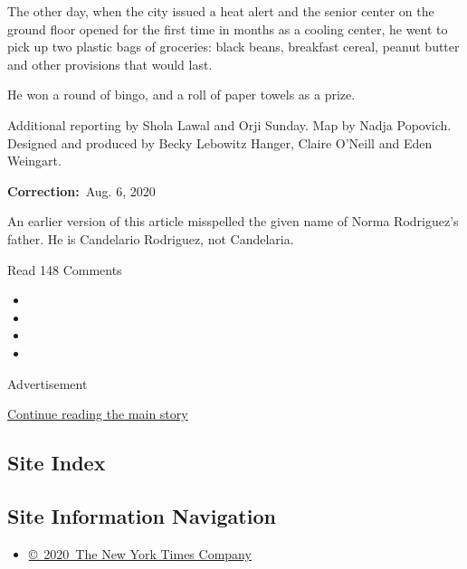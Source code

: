 The other day, when the city issued a heat alert and the senior center
on the ground floor opened for the first time in months as a cooling
center, he went to pick up two plastic bags of groceries: black beans,
breakfast cereal, peanut butter and other provisions that would last.

He won a round of bingo, and a roll of paper towels as a prize.

Additional reporting by Shola Lawal and Orji Sunday. Map by Nadja
Popovich. Designed and produced by Becky Lebowitz Hanger, Claire O'Neill
and Eden Weingart.

\textbf{Correction:}~Aug. 6, 2020

An earlier version of this article misspelled the given name of Norma
Rodriguez's father. He is Candelario Rodriguez, not Candelaria.

Read 148 Comments

\begin{itemize}
\item
\item
\item
\item
\end{itemize}

Advertisement

\protect\hyperlink{after-bottom}{Continue reading the main story}

\hypertarget{site-index}{%
\subsection{Site Index}\label{site-index}}

\hypertarget{site-information-navigation}{%
\subsection{Site Information
Navigation}\label{site-information-navigation}}

\begin{itemize}
\tightlist
\item
  \href{https://help.nytimes3xbfgragh.onion/hc/en-us/articles/115014792127-Copyright-notice}{©~2020~The
  New York Times Company}
\end{itemize}

